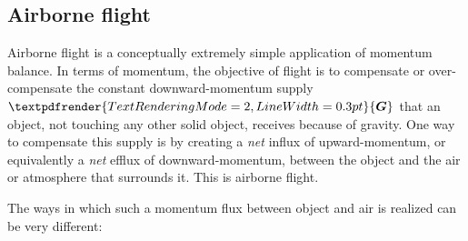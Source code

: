 \documentclass[a4paper,12pt,%
onecolumn,oneside,%
british%
]{memoir}
\renewcommand*{\bm}[1]{\textpdfrender{TextRenderingMode=2,LineWidth=0.3pt}{\boldsymbol{#1}}}
\renewcommand*{\|}[1][]{\nonscript\:#1\vert\nonscript\:\mathopen{}}
\newcommand*{\yG}{\bm{G}}
\begin{document}
\subsection{Airborne flight}
\label{sec:bal_momentum_flight}

Airborne flight is a conceptually extremely simple application of momentum balance.
In terms of momentum, the objective of flight is to compensate or over-compensate the constant downward-momentum supply $\yG$ that an object, not touching any other solid object, receives because of gravity. One way to compensate this supply is by creating a \emph{net} influx of upward-momentum, or equivalently a \emph{net} efflux of downward-momentum, between the object and the air or atmosphere that surrounds it. This is airborne flight.

The ways in which such a momentum flux between object and air is realized can be very different:
\end{document}
